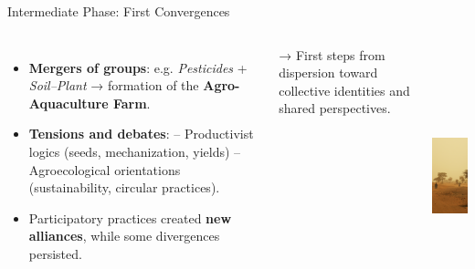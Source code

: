 \documentclass[newPxFont]{beamer}
\begin{document}
\begin{frame}[c]{Intermediate Phase: First Convergences}
  \vspace{-0.5cm}
  \begin{columns}[onlytextwidth,T]
    \column{\dimexpr\linewidth-30mm-5mm}

    \begin{itemize}
      \item \textbf{Mergers of groups}: e.g. \textit{Pesticides} + \textit{Soil–Plant} 
            → formation of the \textbf{Agro-Aquaculture Farm}.  
      \item \textbf{Tensions and debates}:  
            – Productivist logics (seeds, mechanization, yields)  
            – Agroecological orientations (sustainability, circular practices).  
      \item Participatory practices created \textbf{new alliances}, 
            while some divergences persisted.  
    \end{itemize}

    \vspace{0.3cm}
    → First steps from dispersion toward collective identities and shared perspectives.

    \column{30mm}
    
    \includegraphics[height=7.5cm]{img/mobiliette_mbane}
  \end{columns}
\end{frame}
\end{document}
